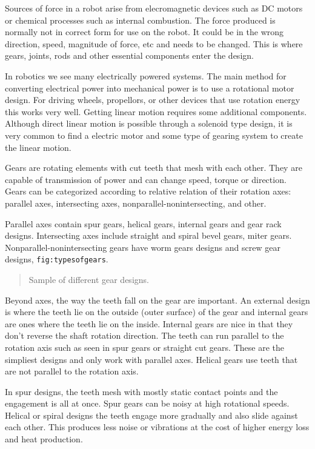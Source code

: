 Sources of force in a robot arise from elecromagnetic devices such as DC
motors or chemical processes such as internal combustion. The force
produced is normally not in correct form for use on the robot. It could
be in the wrong direction, speed, magnitude of force, etc and needs to
be changed. This is where gears, joints, rods and other essential
components enter the design.

In robotics we see many electrically powered systems. The main method
for converting electrical power into mechanical power is to use a
rotational motor design. For driving wheels, propellors, or other
devices that use rotation energy this works very well. Getting linear
motion requires some additional components. Although direct linear
motion is possible through a solenoid type design, it is very common to
find a electric motor and some type of gearing system to create the
linear motion.

Gears are rotating elements with cut teeth that mesh with each other.
They are capable of transmission of power and can change speed, torque
or direction. Gears can be categorized according to relative relation of
their rotation axes: parallel axes, intersecting axes,
nonparallel-nonintersecting, and other.

Parallel axes contain spur gears, helical gears, internal gears and gear
rack designs. Intersecting axes include straight and spiral bevel gears,
miter gears. Nonparallel-nonintersecting gears have worm gears designs
and screw gear designs, \texttt{fig:typesofgears}.

\begin{quote}
Sample of different gear designs.
\end{quote}

Beyond axes, the way the teeth fall on the gear are important. An
external design is where the teeth lie on the outside (outer surface) of
the gear and internal gears are ones where the teeth lie on the inside.
Internal gears are nice in that they don't reverse the shaft rotation
direction. The teeth can run parallel to the rotation axis such as seen
in spur gears or straight cut gears. These are the simpliest designs and
only work with parallel axes. Helical gears use teeth that are not
parallel to the rotation axis.

In spur designs, the teeth mesh with mostly static contact points and
the engagement is all at once. Spur gears can be noisy at high
rotational speeds. Helical or spiral designs the teeth engage more
gradually and also slide against each other. This produces less noise or
vibrations at the cost of higher energy loss and heat production.

